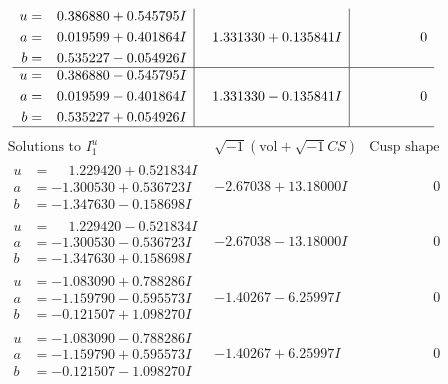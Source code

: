 \documentclass[1p]{elsarticle_modified}
\theoremstyle{definition}
\newcommand{\I}{\sqrt{-1}}
\begin{document}
$$\begin{array}{c|c|c}
\begin{aligned}
u &= \phantom{-}0.386880 + 0.545795 I \\
a &= \phantom{-}0.019599 + 0.401864 I \\
b &= \phantom{-}0.535227 - 0.054926 I\end{aligned}
 & \phantom{-}1.331330 + 0.135841 I & \phantom{-0.000000 } 0 \\ \hline\begin{aligned}
u &= \phantom{-}0.386880 - 0.545795 I \\
a &= \phantom{-}0.019599 - 0.401864 I \\
b &= \phantom{-}0.535227 + 0.054926 I\end{aligned}
 & \phantom{-}1.331330 - 0.135841 I & \phantom{-0.000000 } 0\\
 \hline 
 \end{array}$$\newpage$$\begin{array}{c|c|c}  
\text{Solutions to }I^u_{1}& \I (\text{vol} + \sqrt{-1}CS) & \text{Cusp shape}\\
 \hline 
\begin{aligned}
u &= \phantom{-}1.229420 + 0.521834 I \\
a &= -1.300530 + 0.536723 I \\
b &= -1.347630 - 0.158698 I\end{aligned}
 & -2.67038 + 13.18000 I & \phantom{-0.000000 } 0 \\ \hline\begin{aligned}
u &= \phantom{-}1.229420 - 0.521834 I \\
a &= -1.300530 - 0.536723 I \\
b &= -1.347630 + 0.158698 I\end{aligned}
 & -2.67038 - 13.18000 I & \phantom{-0.000000 } 0 \\ \hline\begin{aligned}
u &= -1.083090 + 0.788286 I \\
a &= -1.159790 - 0.595573 I \\
b &= -0.121507 + 1.098270 I\end{aligned}
 & -1.40267 - 6.25997 I & \phantom{-0.000000 } 0 \\ \hline\begin{aligned}
u &= -1.083090 - 0.788286 I \\
a &= -1.159790 + 0.595573 I \\
b &= -0.121507 - 1.098270 I\end{aligned}
 & -1.40267 + 6.25997 I & \phantom{-0.000000 } 0 \\ \hline\begin{aligned}

\end{aligned}
\end{array}$$
\end{document}
